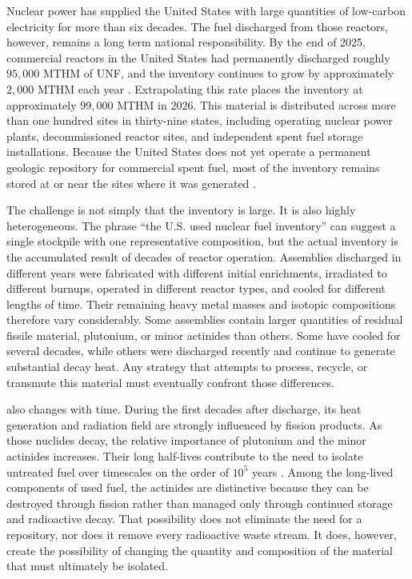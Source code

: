 
Nuclear power has supplied the United States with large quantities of
low-carbon electricity for more than six decades. The fuel discharged from
those reactors, however, remains a long term national responsibility. By the
end of 2025, commercial reactors in the United States had permanently
discharged roughly \(95{,}000\) \gls{MTHM} of \gls{UNF}, and the
inventory continues to grow by approximately \(2{,}000\) \gls{MTHM} each year
\cite{inside_2025,carter_banerjee_inventory_2024}. Extrapolating this rate places the
inventory at approximately \(99{,}000\) \gls{MTHM} in 2026. This material is distributed across
more than one hundred sites in thirty-nine states, including operating nuclear
power plants, decommissioned reactor sites, and independent spent fuel storage
installations. Because the United States does not yet operate a permanent
geologic repository for commercial spent fuel, most of the inventory remains
stored at or near the sites where it was generated
\cite{nrc_spent_fuel_storage}.

The challenge is not simply that the inventory is large. It is also highly
heterogeneous. The phrase ``the U.S. used nuclear fuel inventory'' can suggest
a single stockpile with one representative composition, but the actual
inventory is the accumulated result of decades of reactor operation.
Assemblies discharged in different years were fabricated with different
initial enrichments, irradiated to different burnups, operated in different
reactor types, and cooled for different lengths of time. Their remaining
heavy metal masses and isotopic compositions therefore vary considerably.
Some assemblies contain larger quantities of residual fissile material,
plutonium, or minor actinides than others. Some have cooled for several
decades, while others were discharged recently and continue to generate
substantial decay heat. Any strategy that attempts to process, recycle, or
transmute this material must eventually confront those differences.

 also changes with time. During the first decades after
discharge, its heat generation and radiation field are strongly influenced by
fission products. As those nuclides decay, the relative importance of
plutonium and the minor actinides increases. Their long half-lives contribute
to the need to isolate untreated fuel over timescales on the order of
\(10^{5}\) years \cite{arpa_e_newton_2025}. Among the long-lived components
of used fuel, the actinides are distinctive because they can be destroyed
through fission rather than managed only through continued storage and
radioactive decay. That possibility does not eliminate the need for a
repository, nor does it remove every radioactive waste stream. It does,
however, create the possibility of changing the quantity and composition of
the material that must ultimately be isolated.

